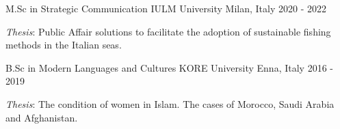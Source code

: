 
\begin{cventries}

\cventry
{M.Sc in Strategic Communication} %
{IULM University} %
{Milan, Italy} %
{2020 - 2022} %
{
\begin{cvitems} %
\item \textit{Thesis}: Public Affair solutions to facilitate
the adoption of sustainable fishing methods in the Italian seas.
\end{cvitems}
}

\cventry
{B.Sc in Modern Languages and Cultures} %
{KORE University} %
{Enna, Italy} %
{2016 - 2019} %
{
\begin{cvitems} %
\item \textit{Thesis}: The condition of women in Islam.
The cases of Morocco, Saudi Arabia and Afghanistan.
\end{cvitems}
}



\end{cventries}